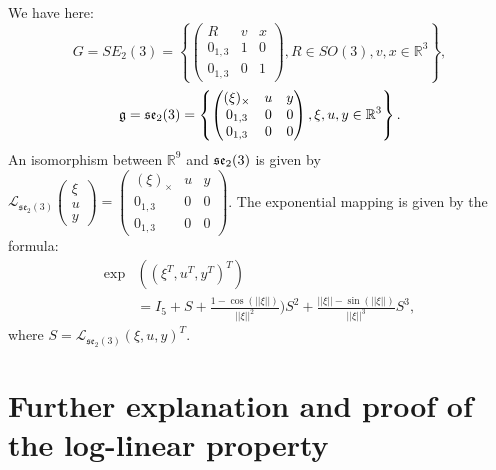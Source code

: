 \documentclass[a4paper,12pt,onecolumn]{article}
\newcommand{\RR}{{\mathbb{R}}}
\begin{document}
We have here: $$G=SE_2(3)=\left\lbrace \begin{pmatrix} R & v & x \\ 0_{1,3} & 1 & 0 \\ 0_{1,3} & 0 & 1 \end{pmatrix}, R \in SO(3), v, x \in \RR^3  \right\rbrace , $$ $$\frak g=\frak{se}_2(3)= \left\lbrace \begin{pmatrix} (\xi)_{\times} & u & y \\ 0_{1,3} & 0 & 0 \\ 0_{1,3} & 0 & 0 \end{pmatrix}, \xi, u, y \in \RR^3  \right\rbrace .$$ An isomorphism between $\RR^9$ and $\frak{se}_2(3)$ is given by $ { \mathcal{L}_{\mathfrak{se}_2(3)} \begin{pmatrix} \xi \\ u \\ y \end{pmatrix} = \begin{pmatrix} (\xi)_{\times} & u & y \\ 0_{1,3} & 0 & 0 \\ 0_{1,3} & 0 & 0 \end{pmatrix}}$. The exponential mapping is given by the formula:
\begin{align*}
\exp & \left( \left( \xi^T , u^T , y^T \right)^T \right) \\
 & = I_5 + S + \frac{1 - \cos(||\xi||)}{||\xi||^2}) S^2 + \frac{ ||\xi|| -\sin(||\xi||)}{||\xi||^3} S^3, 
\end{align*}
where  $S = \mathcal{L}_{\mathfrak{se}_2(3)}(\xi ,u , y )^T$.


















\section{Further explanation and proof of the log-linear property}
\end{document}
